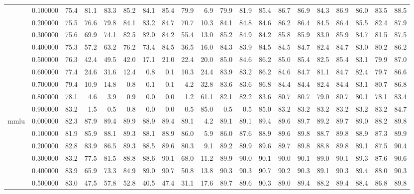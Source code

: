 \begin{tabular}{llrrrrrrrrrrrrrrrrrr}
 & 0.100000 & 75.4 & 81.1 & 83.3 & 85.2 & 84.1 & 85.4 & 79.9 & 6.9 & 79.9 & 81.9 & 85.4 & 86.7 & 86.9 & 84.3 & 86.9 & 86.0 & 83.5 & 88.5 \\
 & 0.200000 & 75.5 & 76.6 & 79.8 & 84.1 & 83.2 & 84.7 & 70.7 & 10.3 & 84.1 & 84.8 & 84.6 & 86.2 & 86.4 & 84.5 & 86.4 & 85.5 & 82.4 & 87.9 \\
 & 0.300000 & 75.6 & 69.9 & 74.1 & 82.5 & 82.0 & 84.2 & 55.4 & 13.0 & 85.2 & 84.9 & 84.2 & 85.8 & 85.9 & 83.0 & 85.9 & 84.7 & 81.5 & 87.5 \\
 & 0.400000 & 75.3 & 57.2 & 63.2 & 76.2 & 73.4 & 84.5 & 36.5 & 16.0 & 84.3 & 83.9 & 84.5 & 84.5 & 84.7 & 82.4 & 84.7 & 83.0 & 80.2 & 86.2 \\
 & 0.500000 & 76.3 & 42.4 & 49.5 & 42.0 & 17.1 & 21.0 & 22.4 & 20.0 & 85.0 & 84.6 & 86.2 & 85.0 & 85.4 & 82.5 & 85.4 & 83.1 & 79.9 & 87.0 \\
 & 0.600000 & 77.4 & 24.6 & 31.6 & 12.4 & 0.8 & 0.1 & 10.3 & 24.4 & 83.9 & 83.2 & 86.2 & 84.6 & 84.7 & 81.1 & 84.7 & 82.4 & 79.7 & 86.6 \\
 & 0.700000 & 79.4 & 10.9 & 14.8 & 0.8 & 0.1 & 0.1 & 4.2 & 32.8 & 83.6 & 83.6 & 86.8 & 84.4 & 84.4 & 82.4 & 84.4 & 83.1 & 80.7 & 86.8 \\
 & 0.800000 & 78.1 & 4.6 & 3.9 & 0.9 & 0.0 & 0.0 & 1.2 & 61.1 & 82.1 & 82.2 & 83.6 & 80.7 & 80.7 & 79.0 & 80.7 & 80.1 & 78.1 & 83.4 \\
 & 0.900000 & 83.2 & 1.5 & 0.5 & 0.8 & 0.0 & 0.0 & 0.5 & 85.0 & 0.5 & 0.5 & 85.0 & 83.2 & 83.2 & 83.2 & 83.2 & 83.2 & 83.2 & 84.7 \\
\cline{1-20}
\multirow[t]{10}{*}{mmlu} & 0.000000 & 82.3 & 87.9 & 89.4 & 89.9 & 88.9 & 89.4 & 89.1 & 4.2 & 89.1 & 89.1 & 89.4 & 89.6 & 89.7 & 89.2 & 89.7 & 89.0 & 88.2 & 89.8 \\
 & 0.100000 & 81.9 & 85.9 & 88.1 & 89.3 & 88.1 & 88.9 & 86.0 & 5.9 & 86.0 & 87.6 & 88.9 & 89.6 & 89.8 & 88.7 & 89.8 & 88.9 & 87.3 & 89.9 \\
 & 0.200000 & 82.8 & 83.9 & 86.5 & 89.3 & 88.5 & 89.6 & 80.3 & 9.1 & 89.2 & 89.9 & 89.6 & 89.7 & 89.8 & 88.8 & 89.8 & 89.1 & 87.5 & 90.4 \\
 & 0.300000 & 83.2 & 77.5 & 81.5 & 88.8 & 88.6 & 90.1 & 68.0 & 11.2 & 89.9 & 90.0 & 90.1 & 90.0 & 90.1 & 89.0 & 90.1 & 89.3 & 87.6 & 90.6 \\
 & 0.400000 & 83.9 & 65.9 & 73.3 & 84.9 & 89.0 & 90.7 & 50.8 & 13.8 & 90.3 & 90.3 & 90.7 & 90.2 & 90.3 & 89.1 & 90.3 & 89.4 & 88.0 & 90.3 \\
 & 0.500000 & 83.0 & 47.5 & 57.8 & 52.8 & 40.5 & 47.4 & 31.1 & 17.6 & 89.7 & 89.6 & 90.3 & 89.0 & 89.4 & 88.2 & 89.4 & 88.4 & 86.8 & 89.8 \\

\end{tabular}
